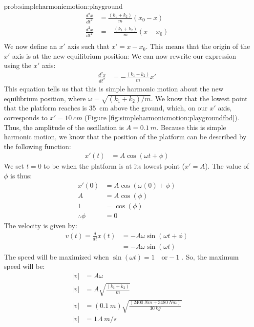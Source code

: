 \begin{solution}{prob:simpleharmonicmotion:playground}
\begin{align*}
\frac{d^2x}{dt^2}&=\frac{(k_1+k_2)}{m}(x_0-x)\\
\frac{d^2x}{dt^2}&=-\frac{(k_1+k_2)}{m}(x-x_0)\\
\end{align*}
We now define an $x'$ axis such that $x'=x-x_0$. This means that the origin of the $x'$ axis is at the new equilibrium position:
We can now rewrite our expression using the $x'$ axis:
\begin{align*}
\frac{d^2x}{dt^2}&=-\frac{(k_1+k_2)}{m}x'
\end{align*}
This equation tells us that this is simple harmonic motion about the new equilibrium position, where $\omega=\sqrt{(k_1+k_2)/m}$. We know that the lowest point that the platform reaches is \SI{35}{cm} above the ground, which, on our $x'$ axis, corresponds to $x'=\SI{10}{cm}$ (Figure \ref{fig:simpleharmonicmotion:playgroundfbd}). Thus, the amplitude of the oscillation is $A=\SI{0.1}{m}$. Because this is simple harmonic motion, we know that the position of the platform can be described by the following function:
\begin{align*}
x'(t)&= A \cos(\omega t + \phi)
\end{align*}
We set $t=0$ to be when the platform is at its lowest point ($x'=A$). The value of $\phi$ is thus:
\begin{align*}
x'(0)&= A \cos(\omega (0) + \phi)\\
A&= A \cos(\phi)\\
1&=\cos(\phi)\\
\therefore \phi&=0
\end{align*}
The velocity is given by:
\begin{align*}
v(t)=\frac{d}{dt}x(t) &= -A\omega\sin(\omega t + \phi)\\
&=-A\omega\sin(\omega t)
\end{align*}
The speed will be maximized when $\sin(\omega t)=1\quad \textrm{or} -1$ . So, the maximum speed will be:
\begin{align*}
|v|&=A\omega\\
|v|&=A\sqrt{\frac{(k_1+k_2)}{m}}\\
|v|&=(\SI{0.1}{m})\sqrt{\frac{(\SI{2400}{Nm}+\SI{3480}{Nm})}{\SI{30}{kg}}}\\
|v|&=\SI{1.4}{m/s}
\end{align*}
\end{solution}


